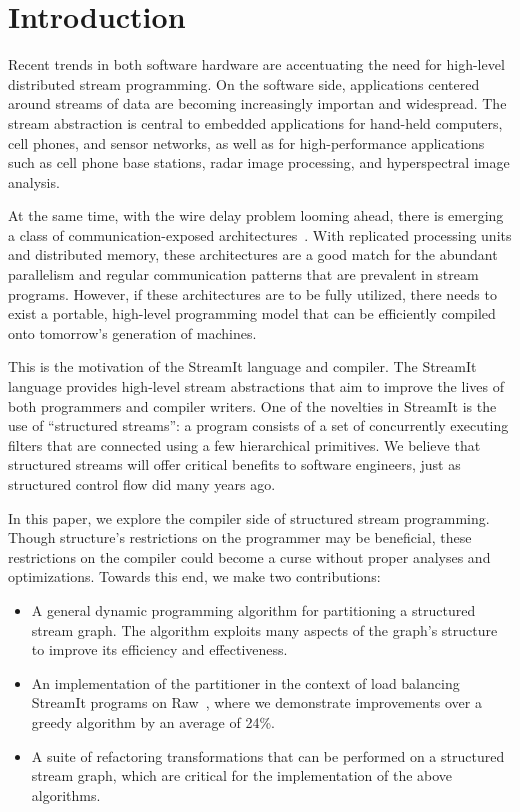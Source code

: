 \section{Introduction}

Recent trends in both software hardware are accentuating the need for
high-level distributed stream programming.  On the software side,
applications centered around streams of data are becoming increasingly
importan and widespread.  The stream abstraction is central to
embedded applications for hand-held computers, cell phones, and sensor
networks, as well as for high-performance applications such as cell
phone base stations, radar image processing, and hyperspectral image
analysis.  

At the same time, with the wire delay problem looming ahead, there is
emerging a class of communication-exposed
architectures~\cite{raw-micro,trips,smartmemories}.  With replicated
processing units and distributed memory, these architectures are a
good match for the abundant parallelism and regular communication
patterns that are prevalent in stream programs.  However, if these
architectures are to be fully utilized, there needs to exist a
portable, high-level programming model that can be efficiently
compiled onto tomorrow's generation of machines.

This is the motivation of the StreamIt language and compiler.  The
StreamIt language provides high-level stream abstractions that aim to
improve the lives of both programmers and compiler writers.  One of
the novelties in StreamIt is the use of ``structured streams'': a
program consists of a set of concurrently executing filters that are
connected using a few hierarchical primitives.  We believe that
structured streams will offer critical benefits to software engineers,
just as structured control flow did many years ago.

In this paper, we explore the compiler side of structured stream
programming.  Though structure's restrictions on the programmer may be
beneficial, these restrictions on the compiler could become a curse
without proper analyses and optimizations.  Towards this end, we make
two contributions:
\begin{itemize}

\item A general dynamic programming algorithm for partitioning a
structured stream graph.  The algorithm exploits many aspects of the
graph's structure to improve its efficiency and effectiveness.

\item An implementation of the partitioner in the context of load
balancing StreamIt programs on Raw~\cite{raw-micro}, where we
demonstrate improvements over a greedy algorithm by an average of
24\%.

\item A suite of refactoring transformations that can be performed on
a structured stream graph, which are critical for the implementation
of the above algorithms.
\end{itemize}

